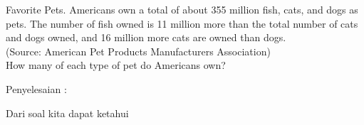 
\begin{eulernotebook}



\begin{eulercomment}
Favorite Pets. Americans own a total of about 355 million fish, cats, and dogs as pets. The number of fish owned is 11 million more than the total number of cats and dogs owned, and 16 million more cats are owned than dogs.\\
(Source: American Pet Products Manufacturers Association)\\
How many of each type of pet do Americans own?

Penyelesaian :

Dari soal kita dapat ketahui


\end{eulercomment}
\end{eulernotebook}
